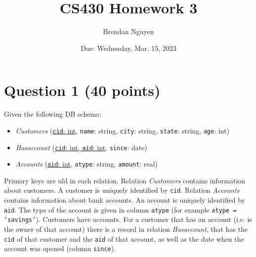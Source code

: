 \documentclass[letterpaper, 11pt]{article}
\title{CS430 Homework 3}
\author{Brendan Nguyen}
\date{Due: Wednesday, Mar. 15, 2023}
\begin{document}
\maketitle

\section*{Question 1 (40 points)}

Given the following DB schema:
\begin{itemize}
    \item \textit{Customers} (\ul{\texttt{cid}: int}, \texttt{name}: string, \texttt{city}: string, \texttt{state}: string, \texttt{age}: int)
    \item \textit{Has\textunderscore account} (\ul{\texttt{cid}: int, \texttt{aid}: int}, \texttt{since}: date)
    \item \textit{Accounts} (\ul{\texttt{aid}: int}, \texttt{atype}: string, \texttt{amount}: real)
\end{itemize}

Primary keys are uld in each relation. Relation \textit{Customers} contains information about customers. A customer is uniquely identified by \texttt{cid}. Relation \textit{Accounts} contains information about bank accounts. An account is uniquely identified by \texttt{aid}. The type of the account is given in column \texttt{atype} (for example  \texttt{atype = `savings'}).  Customers have accounts. For a customer that has an account (i.e. is the owner of that account) there is a record in relation \textit{Has\textunderscore account}, that has the \texttt{cid} of that customer and the \texttt{aid} of that account, as well as the date when the account was opened (column \texttt{since}).
\end{document}
